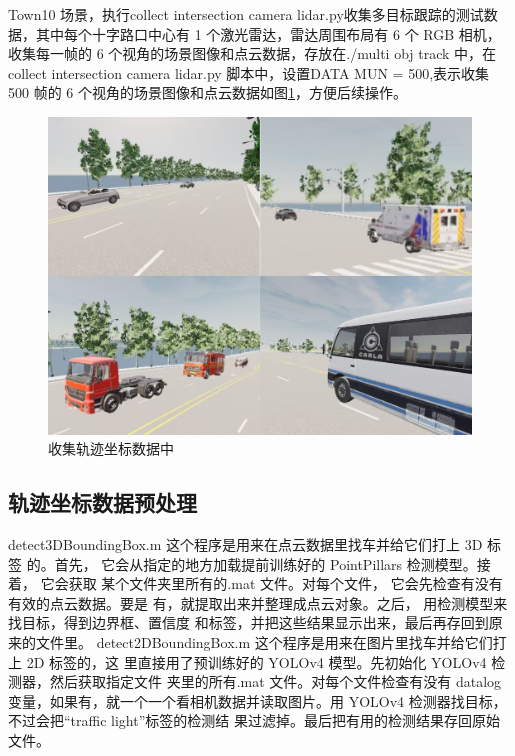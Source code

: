 Town10 场景，执行collect intersection camera lidar.py收集多目标跟踪的测试数据，其中每个十字路口中心有 1 个激光雷达，雷达周围布局有 6 个 RGB 相机，收集每一帧的 6 个视角的场景图像和点云数据，存放在./multi obj track 中，在 collect intersection camera lidar.py 脚本中，设置DATA MUN = 500,表示收集 500 帧的 6 个视角的场景图像和点云数据如图\ref{fig:p41}，方便后续操作。



\begin{figure}[htbp] %
	\centering
	\includegraphics[width=1\textwidth]{p41} %
	\caption{收集轨迹坐标数据中} %
	\label{fig:p41} %
\end{figure}






\subsection{轨迹坐标数据预处理}

detect3DBoundingBox.m 这个程序是用来在点云数据里找车并给它们打上 3D 标签 的。首先， 它会从指定的地方加载提前训练好的 PointPillars 检测模型。接着， 它会获取 某个文件夹里所有的.mat 文件。对每个文件， 它会先检查有没有有效的点云数据。要是 有，就提取出来并整理成点云对象。之后， 用检测模型来找目标，得到边界框、置信度 和标签，并把这些结果显示出来，最后再存回到原来的文件里。
detect2DBoundingBox.m 这个程序是用来在图片里找车并给它们打上 2D 标签的，这 里直接用了预训练好的 YOLOv4 模型。先初始化 YOLOv4 检测器，然后获取指定文件 夹里的所有.mat 文件。对每个文件检查有没有 datalog 变量，如果有，就一个一个看相机数据并读取图片。用 YOLOv4 检测器找目标，不过会把“traffic light”标签的检测结 果过滤掉。最后把有用的检测结果存回原始文件。



